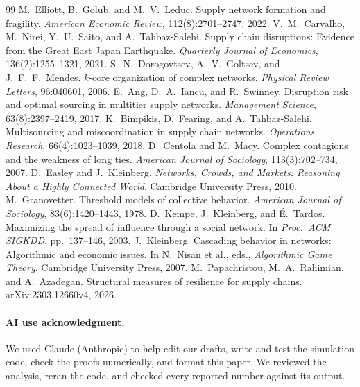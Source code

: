 \documentclass[10pt]{article}
\begin{document}
\newpage
\renewcommand{\refname}{References}
{\small
\begin{thebibliography}{99}\setlength{\itemsep}{1pt}
 M.~Elliott, B.~Golub, and M.~V.~Leduc. Supply network formation and fragility. \emph{American Economic Review}, 112(8):2701--2747, 2022.
 V.~M.~Carvalho, M.~Nirei, Y.~U.~Saito, and A.~Tahbaz-Salehi. Supply chain disruptions: Evidence from the Great East Japan Earthquake. \emph{Quarterly Journal of Economics}, 136(2):1255--1321, 2021.
 S.~N.~Dorogovtsev, A.~V.~Goltsev, and J.~F.~F.~Mendes. $k$-core organization of complex networks. \emph{Physical Review Letters}, 96:040601, 2006.
 E.~Ang, D.~A.~Iancu, and R.~Swinney. Disruption risk and optimal sourcing in multitier supply networks. \emph{Management Science}, 63(8):2397--2419, 2017.
 K.~Bimpikis, D.~Fearing, and A.~Tahbaz-Salehi. Multisourcing and miscoordination in supply chain networks. \emph{Operations Research}, 66(4):1023--1039, 2018.
 D.~Centola and M.~Macy. Complex contagions and the weakness of long ties. \emph{American Journal of Sociology}, 113(3):702--734, 2007.
 D.~Easley and J.~Kleinberg. \emph{Networks, Crowds, and Markets: Reasoning About a Highly Connected World}. Cambridge University Press, 2010.
 M.~Granovetter. Threshold models of collective behavior. \emph{American Journal of Sociology}, 83(6):1420--1443, 1978.
 D.~Kempe, J.~Kleinberg, and \'E.~Tardos. Maximizing the spread of influence through a social network. In \emph{Proc.\ ACM SIGKDD}, pp.\ 137--146, 2003.
 J.~Kleinberg. Cascading behavior in networks: Algorithmic and economic issues. In N.~Nisan et al., eds., \emph{Algorithmic Game Theory}. Cambridge University Press, 2007.
 M.~Papachristou, M.~A.~Rahimian, and A.~Azadegan. Structural measures of resilience for supply chains. arXiv:2303.12660v4, 2026.
\end{thebibliography}
}

\paragraph{AI use acknowledgment.} We used Claude (Anthropic) to help edit our drafts, write and test the simulation code, check the proofs numerically, and format this paper. We reviewed the analysis, reran the code, and checked every reported number against its output.
\end{document}
